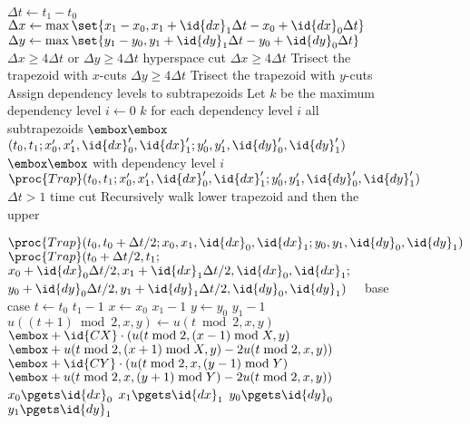\begin{figure}
\small
\begin{codebox}
\li $\Delta t \gets t_1 - t_0$
\li $\Delta x \gets \max\set{x_1-x_0, x_1+\id{dx}_1\Delta t - x_0+\id{dx}_0\Delta t}$
\li $\Delta y \gets \max\set{y_1-y_0, y_1+\id{dy}_1\Delta t - y_0+\id{dy}_0\Delta t}$
\li \If $\Delta x \geq 4\Delta t$ or $\Delta y \geq 4\Delta t$ 
         \Comment hyperspace cut \label{li:canCut}
\li      \Then \If $\Delta x \geq 4\Delta t$ \label{li:cutX}
\li       	        \Then Trisect the trapezoid with $x$-cuts
     		    \End
\li            \If $\Delta y \geq 4\Delta t$ 
\li                 \Then Trisect the trapezoid with $y$-cuts
               \End \label{li:cutY}
\li            Assign dependency levels to subtrapezoids
\li            Let $k$ be the maximum dependency level
\li  \For $i \gets 0$ \To $k$ \label{li:parallelSpawnBegin}
       \Comment for each dependency level $i$
\li 	\Do \Parfor all subtrapezoids 
\zi $\embox\embox$ $(t_0, t_1; x'_0, x'_1, \id{dx}'_0, \id{dx}'_1; y'_0, y'_1, \id{dy}'_0, \id{dy}'_1)$ 
\zi  $\embox\embox$ with dependency level $i$
\li    \Do    $\proc{Trap}(t_0, t_1; x'_0, x'_1, \id{dx}'_0, \id{dx}'_1; y'_0, y'_1, \id{dy}'_0, \id{dy}'_1)$ \label{li:parallelSpawnEnd}
    \End    \End 
\li \ElseIf $\Delta t > 1$ \Comment time cut \label{li:simTimeCutBegin}
\li \Then \Comment Recursively walk lower trapezoid and then the upper

\li  $\proc{Trap}(t_0, t_0 + \Delta t/2; 
                 x_0, x_1, \id{dx}_0, \id{dx}_1;
                 y_0, y_1, \id{dy}_0, \id{dy}_1)$
\li  $\proc{Trap}(t_0 + \Delta t/2, t_1;$
                 $x_0 + \id{dx}_0 \Delta t/2, x_1 + \id{dx}_1 \Delta t/2, \id{dx}_0, \id{dx}_1;$ 
\zi              $y_0 + \id{dy}_0 \Delta t/2, y_1 + \id{dy}_1 \Delta t/2, \id{dy}_0, \id{dy}_1)$ \label{li:simTimeCutEnd}
\li \Else \ \ \Comment base case \label{li:simBaseCaseBegin}
\li 	\For $t \gets t_0$ \To $t_1-1$ 
\li          \Do \For $x \gets x_0$ \To $x_1-1$
\li             \Do \For $y \gets y_0$ \To $y_1-1$
\li                 \Do $u((t+1)\bmod 2,x,y) \gets u(t\bmod 2,x,y) $
\zi  $\embox + \id{CX}\cdot ( u(t\bmod 2, (x-1)\bmod X, y) $
\zi  $\embox + u(t\bmod 2, (x+1)\bmod X, y) -2 u (t\bmod 2, x, y)) $
\zi  $\embox + \id{CY}\cdot ( u(t\bmod 2, x, (y-1)\bmod Y) $
\zi  $\embox + u(t\bmod 2, x, (y+1)\bmod Y) -2u(t\bmod 2, x, y) )$
	\End
	\End
	\End
\li \> $x_0 \pgets \id{dx}_0$
\li \> $x_1 \pgets \id{dx}_1$
\li \> $y_0 \pgets \id{dy}_0$
\li \> $y_1 \pgets \id{dy}_1$ \label{li:simBaseCaseEnd}
\End 
\end{codebox}


\end{figure}

